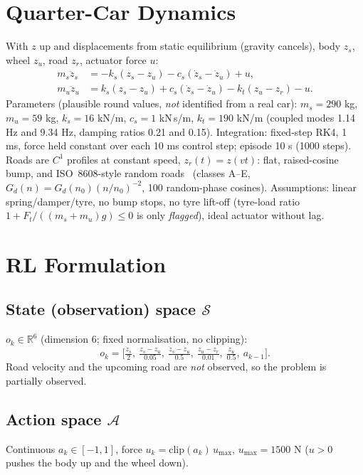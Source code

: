 \documentclass[10pt,twocolumn]{article}
\begin{document}
\section{Quarter-Car Dynamics}
With $z$ up and displacements from static equilibrium (gravity cancels), body $z_s$, wheel $z_u$, road $z_r$, actuator force $u$:
\begin{align}
m_s\ddot z_s &= -k_s(z_s-z_u)-c_s(\dot z_s-\dot z_u)+u,\\
m_u\ddot z_u &= k_s(z_s-z_u)+c_s(\dot z_s-\dot z_u)-k_t(z_u-z_r)-u.
\end{align}
Parameters (plausible round values, \emph{not} identified from a real car): $m_s{=}290$ kg, $m_u{=}59$ kg, $k_s{=}16$ kN/m, $c_s{=}1$ kN\,s/m, $k_t{=}190$ kN/m (coupled modes 1.14 Hz and 9.34 Hz, damping ratios 0.21 and 0.15). Integration: fixed-step RK4, 1 ms, force held constant over each 10 ms control step; episode 10 s (1000 steps). Roads are $C^1$ profiles at constant speed, $z_r(t){=}z(vt)$: flat, raised-cosine bump, and ISO~8608-style random roads~\cite{iso8608} (classes A--E, $G_d(n){=}G_d(n_0)(n/n_0)^{-2}$, 100 random-phase cosines). Assumptions: linear spring/damper/tyre, no bump stops, no tyre lift-off (tyre-load ratio $1{+}F_t/((m_s{+}m_u)g)\le0$ is only \emph{flagged}), ideal actuator without lag.

\section{RL Formulation}
\subsection{State (observation) space $\mathcal S$}
$o_k\in\mathbb R^{6}$ (dimension 6; fixed normalisation, no clipping):
\[
o_k=\Big[\tfrac{\ddot z_s}{2},\ \tfrac{z_s-z_u}{0.05},\ \tfrac{\dot z_s-\dot z_u}{0.5},\ \tfrac{z_u-z_r}{0.01},\ \tfrac{\dot z_u}{0.5},\ a_{k-1}\Big].
\]
Road velocity and the upcoming road are \emph{not} observed, so the problem is partially observed.
\subsection{Action space $\mathcal A$}
Continuous $a_k\in[-1,1]$, force $u_k=\mathrm{clip}(a_k)\,u_{\max}$, $u_{\max}{=}1500$ N ($u{>}0$ pushes the body up and the wheel down).
\end{document}
